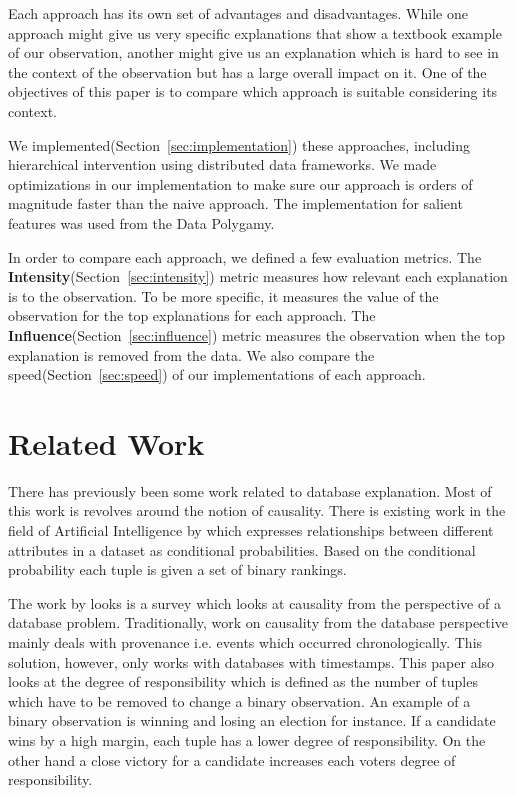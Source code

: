 Each approach has its own set of advantages and disadvantages. While one approach might give us very specific explanations that show a textbook example of our observation, another might give us an explanation which is hard to see in the context of the observation but has a large overall impact on it. One of the objectives of this paper is to compare which approach is suitable considering its context.

We implemented(Section~\ref{sec:implementation}) these approaches, including hierarchical intervention using distributed data frameworks\citep{borthakur2007hadoop,dean2008mapreduce,shanahan2015large,zaharia2016apache}. We made optimizations in our implementation to make sure our approach is orders of magnitude faster than the naive approach. The implementation for salient features was used from the Data Polygamy.

In order to compare each approach, we defined a few evaluation metrics. The \textbf{Intensity}(Section~\ref{sec:intensity}) metric measures how relevant each explanation is to the observation. To be more specific, it measures the value of the observation for the top explanations for each approach. The \textbf{Influence}(Section~\ref{sec:influence}) metric measures the observation when the top explanation is removed from the data. We also compare the speed(Section~\ref{sec:speed}) of our implementations of each approach.

\section{Related Work}
There has previously been some work related to database explanation. Most of this work is revolves around the notion of causality. There is existing work in the field of Artificial Intelligence by \cite{zhang2002discovering} which expresses relationships between different attributes in a dataset as conditional probabilities. Based on the conditional probability each tuple is given a set of binary rankings.

The work by \cite{meliou2010causality} looks is a survey which looks at causality from the perspective of a database problem. Traditionally, work on causality from the database perspective mainly deals with provenance i.e. events which occurred chronologically. This solution, however, only works with databases with timestamps. This paper also looks at the degree of responsibility which is defined as the number of tuples which have to be removed to change a binary observation. An example of a binary observation is winning and losing an election for instance. If a candidate wins by a high margin, each tuple has a lower degree of responsibility. On the other hand a close victory for a candidate increases each voters degree of responsibility.

